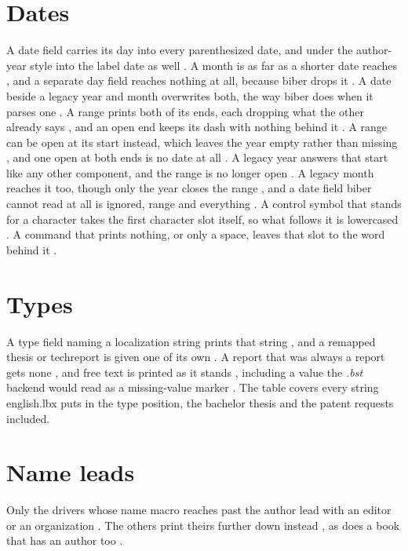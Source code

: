 \documentclass[acmsmall,nonacm,natbib=false]{acmart}
\begin{document}
\thispagestyle{empty}

\section*{Dates}
A date field carries its day into every parenthesized date, and under the author-year style into the label date as well \cite{DtArticle,DtMisc,DtBook,DtReport,DtPatent}.
A month is as far as a shorter date reaches \cite{DtMonth,DtShortMonth}, and a separate day field reaches nothing at all, because biber drops it \cite{DtDayField}.
A date beside a legacy year and month overwrites both, the way biber does when it parses one \cite{DtOverwrite}.
A range prints both of its ends, each dropping what the other already says \cite{DtRange,DtCrossRange,DtYearRange}, and an open end keeps its dash with nothing behind it \cite{DtOpenRange}.
A range can be open at its start instead, which leaves the year empty rather than missing \cite{DtOpenStart}, and one open at both ends is no date at all \cite{DtBothOpen}.
A legacy year answers that start like any other component, and the range is no longer open \cite{DtLegacyStart}.
A legacy month reaches it too, though only the year closes the range \cite{DtMonthOnly}, and a date field biber cannot read at all is ignored, range and everything \cite{DtNoDate}.
A control symbol that stands for a character takes the first character slot itself, so what follows it is lowercased \cite{ScAmp,ScPct}.
A command that prints nothing, or only a space, leaves that slot to the word behind it \cite{ScRelax,ScSpace,ScSlash,ScThin}.

\section*{Types}
A type field naming a localization string prints that string \cite{TyCand,TyRes,TySoftware,TyManual,TyDataset,TyPatent}, and a remapped thesis or techreport is given one of its own \cite{TyTechNone,TyPhd,TyMa}.
A report that was always a report gets none \cite{TyReportNone}, and free text is printed as it stands \cite{TyFree}, including a value the \emph{.bst} backend would read as a missing-value marker \cite{TyMarker}.
The table covers every string english.lbx puts in the type position, the bachelor thesis \cite{TyBachelor} and the patent requests \cite{TyPatreq,TyPatrequs} included.

\section*{Name leads}
Only the drivers whose name macro reaches past the author lead with an editor or an organization \cite{LdEditorOne,LdEditorTwo,LdEditorMisc,LdOrg}.
The others print theirs further down instead \cite{LdArticle,LdIncoll,LdInproc}, as does a book that has an author too \cite{LdBoth}.
\end{document}
